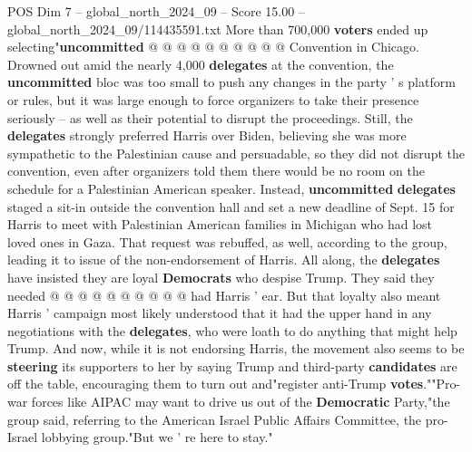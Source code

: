 \begin{textsample}{POS Dim 7 – global\_north\_2024\_09 – Score 15.00 – global\_north\_2024\_09/114435591.txt}
More than 700,000 \textbf{voters} ended up selecting"\textbf{uncommitted} @ @ @ @ @ @ @ @ @ @ Convention in Chicago.
Drowned out amid the nearly 4,000 \textbf{delegates} at the convention, the \textbf{uncommitted} bloc was too small to push any changes in the party ' s platform or rules, but it was large enough to force organizers to take their presence seriously -- as well as their potential to disrupt the proceedings.
Still, the \textbf{delegates} strongly preferred Harris over Biden, believing she was more sympathetic to the Palestinian cause and persuadable, so they did not disrupt the convention, even after organizers told them there would be no room on the schedule for a Palestinian American speaker.
Instead, \textbf{uncommitted} \textbf{delegates} staged a sit-in outside the convention hall and set a new deadline of Sept. 15 for Harris to meet with Palestinian American families in Michigan who had lost loved ones in Gaza.
That request was rebuffed, as well, according to the group, leading it to issue of the non-endorsement of Harris.
All along, the \textbf{delegates} have insisted they are loyal \textbf{Democrats} who despise Trump.
They said they needed @ @ @ @ @ @ @ @ @ @ had Harris ' ear.
But that loyalty also meant Harris ' campaign most likely understood that it had the upper hand in any negotiations with the \textbf{delegates}, who were loath to do anything that might help Trump.
And now, while it is not endorsing Harris, the movement also seems to be \textbf{steering} its supporters to her by saying Trump and third-party \textbf{candidates} are off the table, encouraging them to turn out and"register anti-Trump \textbf{votes}.""Pro-war forces like AIPAC may want to drive us out of the \textbf{Democratic} Party,"the group said, referring to the American Israel Public Affairs Committee, the pro-Israel lobbying group."But we ' re here to stay."

\end{textsample}
